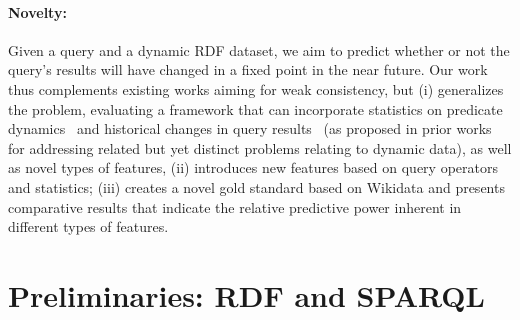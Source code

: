 \documentclass[runningheads]{llncs}
\newcommand{\ah}[1]{{\color{blue}\textsc{ah:} #1}}
\begin{document}
\paragraph{Novelty:} Given a query and a dynamic RDF dataset, we aim to predict whether or not the query's results will have changed in a fixed point in the near future. Our work thus complements existing works aiming for weak consistency, but (i) generalizes the problem, evaluating a framework that can incorporate statistics on predicate dynamics~\cite{UmbrichKHP12,UmbrichKPPH12,ekawUmbrichKHP12,DehghanzadehPKUHD14} and historical changes in query results~\cite{KnuthHS16} (as proposed in prior works for addressing related but yet distinct problems relating to dynamic data), as well as novel types of features, (ii) introduces new features based on query operators and statistics; (iii) creates a novel gold standard based on Wikidata and presents comparative results that indicate the relative predictive power inherent in different types of features.


%
\section{Preliminaries: RDF and SPARQL}
\label{sec:preliminar}
\end{document}
